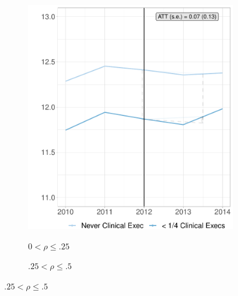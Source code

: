\documentclass[12pt]{article}
\begin{document}
    \begin{figure}[ht!]
     \caption{Effect of Clinical Experience on Mortality Rates, Binned Treatment}
     \centering
     \begin{subfigure}[b]{0.45\textwidth}
         \centering
         \caption{$0 < \rho \leq .25$}
         \includegraphics[width=\textwidth]{Objects/cont_onefourthmort_md_nomd_synth_graph.pdf}
         \label{fig:onefourth_mort_synth_clinical}
     \end{subfigure}
     \hfill
     \begin{subfigure}[b]{0.45\textwidth}
         \centering
         \caption{$.25 < \rho \leq .5$}

\end{subfigure}
\end{figure}
\end{document}
